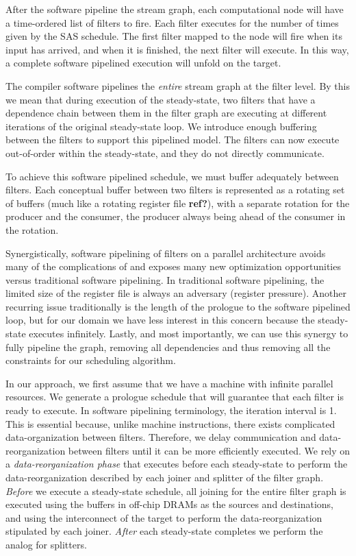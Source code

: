 After the software pipeline the stream graph, each computational node
will have a time-ordered list of filters to fire. Each filter executes
for the number of times given by the SAS schedule.  The first filter
mapped to the node will fire when its input has arrived, and when it
is finished, the next filter will execute.  In this way, a complete
software pipelined execution will unfold on the target.

The compiler software pipelines the {\it entire} stream graph at the
filter level. By this we mean that during execution of the
steady-state, two filters that have a dependence chain between them in
the filter graph are executing at different iterations of the original
steady-state loop.  We introduce enough buffering between the filters
to support this pipelined model. The filters can now execute
out-of-order within the steady-state, and they do not directly
communicate.  

To achieve this software pipelined schedule, we must buffer adequately
between filters.  Each conceptual buffer between two filters is
represented as a rotating set of buffers (much like a rotating
register file \textbf{ref?}), with a separate rotation for the
producer and the consumer, the producer always being ahead of the
consumer in the rotation.

Synergistically, software pipelining of filters on a parallel
architecture avoids many of the complications of and exposes many new
optimization opportunities versus traditional software pipelining.  In
traditional software pipelining, the limited size of the register file
is always an adversary (register pressure).  Another recurring issue
traditionally is the length of the prologue to the software pipelined
loop, but for our domain we have less interest in this concern because
the steady-state executes infinitely.  Lastly, and most importantly,
we can use this synergy to fully pipeline the graph, removing all
dependencies and thus removing all the constraints for our scheduling
algorithm.

In our approach, we first assume that we have a machine with infinite
parallel resources.  We generate a prologue schedule that will
guarantee that each filter is ready to execute.  In software pipelining
terminology, the iteration interval is 1.  This is essential because,
unlike machine instructions, there exists complicated
data-organization between filters. Therefore, we delay communication
and data-reorganization between filters until it can be more
efficiently executed.  We rely on a {\it data-reorganization
phase} that executes before each steady-state to perform the
data-reorganization described by each joiner and splitter of the filter
graph.  {\it Before} we execute a steady-state schedule, all joining
for the entire filter graph is executed using the buffers in off-chip
DRAMs as the sources and destinations, and using the interconnect of
the target to perform the data-reorganization stipulated by each
joiner.  {\it After} each steady-state completes we perform the analog
for splitters.

